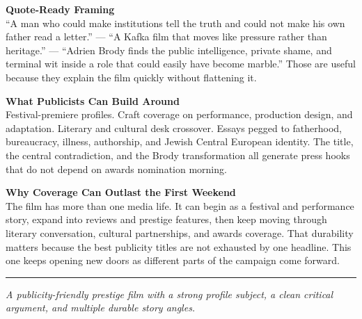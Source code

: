 \documentclass[11pt,letterpaper]{article}
\begin{document}
\vspace{2pt}

\textbf{Quote-Ready Framing}\\
``A man who could make institutions tell the truth and could not make his own father read a letter.'' --- ``A Kafka film that moves like pressure rather than heritage.'' --- ``Adrien Brody finds the public intelligence, private shame, and terminal wit inside a role that could easily have become marble.'' Those are useful because they explain the film quickly without flattening it.

\vspace{2pt}

\textbf{What Publicists Can Build Around}\\
Festival-premiere profiles. Craft coverage on performance, production design, and adaptation. Literary and cultural desk crossover. Essays pegged to fatherhood, bureaucracy, illness, authorship, and Jewish Central European identity. The title, the central contradiction, and the Brody transformation all generate press hooks that do not depend on awards nomination morning.

\vspace{2pt}

\textbf{Why Coverage Can Outlast the First Weekend}\\
The film has more than one media life. It can begin as a festival and performance story, expand into reviews and prestige features, then keep moving through literary conversation, cultural partnerships, and awards coverage. That durability matters because the best publicity titles are not exhausted by one headline. This one keeps opening new doors as different parts of the campaign come forward.

\vspace{4pt}
\textcolor{sectionrule}{\rule{\textwidth}{0.5pt}}
\vspace{2pt}
\begin{center}
{\small\color{kafkalight}\textit{A publicity-friendly prestige film with a strong profile subject, a clean critical argument, and multiple durable story angles.}}
\end{center}
\end{document}
